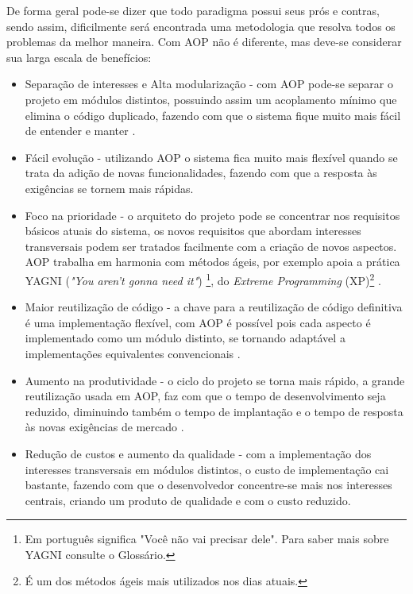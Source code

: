 \documentclass[tc,oneside]{iiufrgs}
\begin{document}
De forma geral pode-se dizer que todo paradigma possui seus prós e contras, sendo assim, dificilmente será encontrada uma metodologia que resolva todos os problemas da melhor maneira. Com AOP não é diferente, mas deve-se considerar sua larga escala de benefícios:

\begin{itemize}
\item Separação de interesses e Alta modularização - com AOP pode-se separar o projeto em módulos distintos, possuindo assim um acoplamento mínimo que elimina o código duplicado, fazendo com que o sistema fique muito mais fácil de entender e manter \cite{laddad2003aspectj}.
\item Fácil evolução - utilizando AOP o sistema fica muito mais flexível quando se trata da adição de novas funcionalidades, fazendo com que a resposta às exigências se tornem mais rápidas.
\item Foco na prioridade - o arquiteto do projeto pode se concentrar nos requisitos básicos atuais do sistema, os novos requisitos que abordam interesses transversais podem ser tratados facilmente com a criação de novos aspectos. AOP trabalha em harmonia com métodos ágeis, por exemplo apoia a prática YAGNI (\textit{"You aren’t gonna need it"}) \footnote{Em português significa "Você não vai precisar dele". Para saber mais sobre YAGNI consulte o Glossário.}, do \textit{Extreme Programming} (XP)\footnote{É um dos métodos ágeis mais utilizados nos dias atuais.} \cite{laddad2003aspectj}.
\item Maior reutilização de código - a chave para a reutilização de código definitiva é uma implementação flexível, com AOP é possível pois cada aspecto é implementado como um módulo distinto, se tornando adaptável a implementações equivalentes convencionais \cite{laddad2003aspectj}. 
\item Aumento na produtividade - o ciclo do projeto se torna mais rápido, a grande reutilização usada em AOP, faz com que o tempo de desenvolvimento seja reduzido, diminuindo também o tempo de implantação e o tempo de resposta às novas exigências de mercado \cite{laddad2003aspectj}. 
\item Redução de custos e aumento da qualidade - com a implementação dos interesses transversais em módulos distintos, o custo de implementação cai bastante, fazendo com que o desenvolvedor concentre-se mais nos interesses centrais, criando um produto de qualidade e com o custo reduzido.
\end{itemize}
\end{document}
